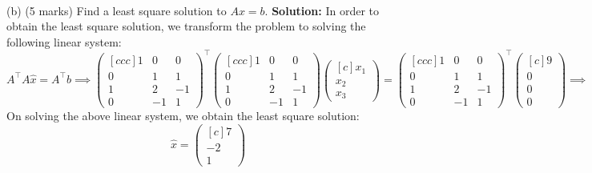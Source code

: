 \documentclass{article}
\begin{document}
\newline
\\ (b) (5 marks) Find a least square solution to $Ax = b$.
\newline
\textbf{Solution:}
In order to obtain the least square solution, we transform the problem to solving the following linear system:
$$A^\top A \hat{x} = A^\top b \implies 
\begin{pmatrix}[ccc]
    1 & 0 & 0 \\
    0 & 1 & 1\\
    1 & 2 & -1 \\
    0 & -1 & 1
\end{pmatrix} ^ \top \begin{pmatrix}[ccc]
    1 & 0 & 0 \\
    0 & 1 & 1\\
    1 & 2 & -1 \\
    0 & -1 & 1
\end{pmatrix} \begin{pmatrix}[c] x_1 \\ x_2 \\ x_3 \end{pmatrix} = \begin{pmatrix}[ccc]
    1 & 0 & 0 \\
    0 & 1 & 1\\
    1 & 2 & -1 \\
    0 & -1 & 1
\end{pmatrix}^ \top \begin{pmatrix}[c] 9 \\ 0 \\ 0 \\ 0  \end{pmatrix} \implies
\begin{pmatrix}[ccc]
    2 & 2 & -1 \\
    2 & 6 & -2\\
    -1 & -2 & 3 
\end{pmatrix} \begin{pmatrix}[c] x_1 \\ x_2 \\ x_3  \end{pmatrix} = \begin{pmatrix}[c] 9 \\ 0 \\ 0   \end{pmatrix}$$
On solving the above linear system, we obtain the least square solution:
$$ \hat{x} = \begin{pmatrix}[c] 7 \\ -2 \\ 1   \end{pmatrix}$$
\end{document}
